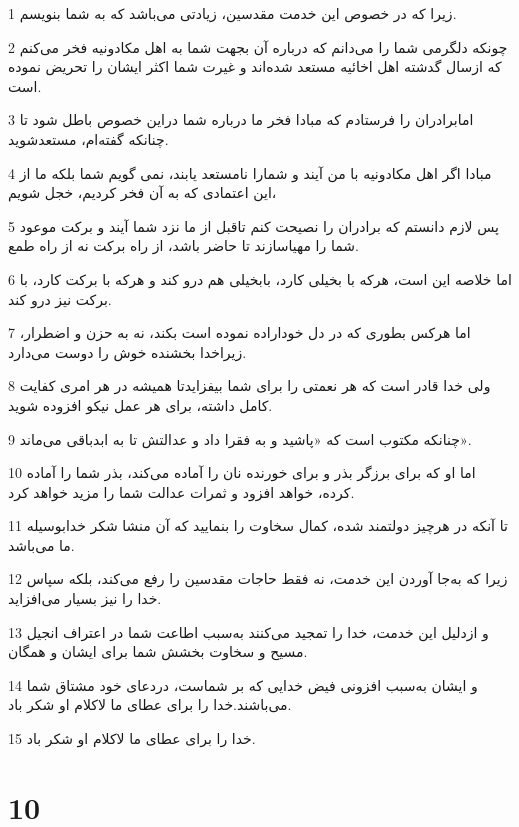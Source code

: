 \par 1 زیرا که در خصوص این خدمت مقدسین، زیادتی می‌باشد که به شما بنویسم.
\par 2 چونکه دلگرمی شما را می‌دانم که درباره آن بجهت شما به اهل مکادونیه فخر می‌کنم که ازسال گدشته اهل اخائیه مستعد شده‌اند و غیرت شما اکثر ایشان را تحریض نموده است.
\par 3 امابرادران را فرستادم که مبادا فخر ما درباره شما دراین خصوص باطل شود تا چنانکه گفته‌ام، مستعدشوید.
\par 4 مبادا اگر اهل مکادونیه با من آیند و شمارا نامستعد یابند، نمی گویم شما بلکه ما از این اعتمادی که به آن فخر کردیم، خجل شویم،
\par 5 پس لازم دانستم که برادران را نصیحت کنم تاقبل از ما نزد شما آیند و برکت موعود شما را مهیاسازند تا حاضر باشد، از راه برکت نه از راه طمع.
\par 6 اما خلاصه این است، هرکه با بخیلی کارد، بابخیلی هم درو کند و هرکه با برکت کارد، با برکت نیز درو کند.
\par 7 اما هرکس بطوری که در دل خوداراده نموده است بکند، نه به حزن و اضطرار، زیراخدا بخشنده خوش را دوست می‌دارد.
\par 8 ولی خدا قادر است که هر نعمتی را برای شما بیفزایدتا همیشه در هر امری کفایت کامل داشته، برای هر عمل نیکو افزوده شوید.
\par 9 چنانکه مکتوب است که «پاشید و به فقرا داد و عدالتش تا به ابدباقی می‌ماند».
\par 10 اما او که برای برزگر بذر و برای خورنده نان را آماده می‌کند، بذر شما را آماده کرده، خواهد افزود و ثمرات عدالت شما را مزید خواهد کرد.
\par 11 تا آنکه در هرچیز دولتمند شده، کمال سخاوت را بنمایید که آن منشا شکر خدابوسیله ما می‌باشد.
\par 12 زیرا که به‌جا آوردن این خدمت، نه فقط حاجات مقدسین را رفع می‌کند، بلکه سپاس خدا را نیز بسیار می‌افزاید.
\par 13 و ازدلیل این خدمت، خدا را تمجید می‌کنند به‌سبب اطاعت شما در اعتراف انجیل مسیح و سخاوت بخشش شما برای ایشان و همگان.
\par 14 و ایشان به‌سبب افزونی فیض خدایی که بر شماست، دردعای خود مشتاق شما می‌باشند.خدا را برای عطای ما لاکلام او شکر باد.
\par 15 خدا را برای عطای ما لاکلام او شکر باد.

\chapter{10}

